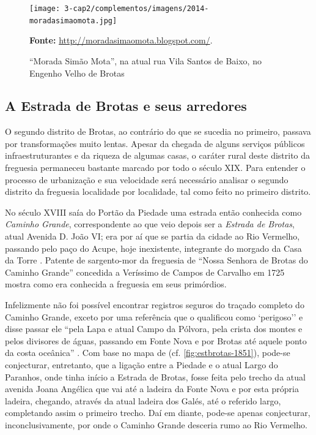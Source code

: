 \begin{figure}
\caption{``Morada Simão Mota'', na atual rua Vila Santos de Baixo, no Engenho Velho de Brotas}
\centering
\texttt{[image: 3-cap2/complementos/imagens/2014-moradasimaomota.jpg]}{\footnotesize \par \textbf{Fonte:} \url{http://moradasimaomota.blogspot.com/}. } 
\label{fig:2014-moradasimaomota}
\end{figure}

\subsection{A Estrada de Brotas e seus arredores}\label{subsec:estrabrotas}



O segundo distrito de Brotas, ao contrário do que se sucedia no primeiro, passava por transformações muito lentas. Apesar da chegada de alguns serviços públicos infraestruturantes e da riqueza de algumas casas, o caráter rural deste distrito da freguesia permaneceu bastante marcado por todo o século XIX. Para entender o processo de urbanização e sua velocidade será necessário analisar o segundo distrito da freguesia localidade por localidade, tal como feito no primeiro distrito.

No século XVIII saía do Portão da Piedade uma estrada então conhecida como \textit{Caminho Grande}, correspondente ao que veio depois ser a \textit{Estrada de Brotas}, atual Avenida D. João VI; era por aí que se partia da cidade ao Rio Vermelho, passando pelo paço do Acupe, hoje inexistente, integrante do morgado da Casa da Torre \cite[p.~85]{campos_brotas_1942}. Patente de sargento-mor da freguesia de ``Nossa Senhora de Brotas do Caminho Grande'' concedida a Veríssimo de Campos de Carvalho em 1725 \cite[p.~114]{texmel_manusbn_1896} mostra como era conhecida a freguesia em seus primórdios.

Infelizmente não foi possível encontrar registros seguros do traçado completo do Caminho Grande, exceto por uma referência que o qualificou como `perigoso'' e disse passar ele ``pela Lapa e atual Campo da Pólvora, pela crista dos montes e pelos divisores de águas, passando em Fonte Nova e por Brotas até aquele ponto da costa oceânica'' \cite[p.~488]{sampaio_salvador_2016}. Com base no mapa de  (cf. \autoref{fig:estbrotas-1851}), pode-se conjecturar, entretanto, que a ligação entre a Piedade e o atual Largo do Paranhos, onde tinha início a Estrada de Brotas, fosse feita pelo trecho da atual avenida Joana Angélica que vai até a ladeira da Fonte Nova e por esta própria ladeira, chegando, através da atual ladeira dos Galés, até o referido largo, completando assim o primeiro trecho. Daí em diante, pode-se apenas conjecturar, inconclusivamente, por onde o Caminho Grande desceria rumo ao Rio Vermelho.

